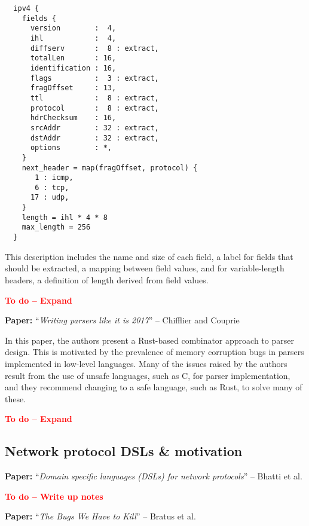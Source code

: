 \documentclass[10pt,a4paper]{article}
\newcommand{\todo}[1]{\textbf{\textcolor{red}{To do -- #1}}}
\newcommand{\paper}[3]{\vspace{4mm}\noindent\textbf{Paper:} ``\textit{#1}'' -- #2 \cite{#3}\vspace{3mm}}
\begin{document}
\begin{verbatim}
  ipv4 {
    fields {
      version        :  4,
      ihl            :  4,
      diffserv       :  8 : extract,
      totalLen       : 16,
      identification : 16,
      flags          :  3 : extract,
      fragOffset     : 13,
      ttl            :  8 : extract,
      protocol       :  8 : extract,
      hdrChecksum    : 16,
      srcAddr        : 32 : extract,
      dstAddr        : 32 : extract,
      options        : *,
    }
    next_header = map(fragOffset, protocol) {
       1 : icmp,
       6 : tcp,
      17 : udp,
    }
    length = ihl * 4 * 8
    max_length = 256
  }
\end{verbatim}

This description includes the name and size of each field, a label for fields that should
be extracted, a mapping between field values, and for variable-length headers, a
definition of length derived from field values.

\todo{Expand}

\paper{Writing parsers like it is 2017}{Chifflier and Couprie}{chifflier2017writing}

In this paper, the authors present a Rust-based combinator approach to parser design. This
is motivated by the prevalence of memory corruption bugs in parsers implemented in
low-level languages. Many of the issues raised by the authors result from the use of
unsafe languages, such as C, for parser implementation, and they recommend changing to a 
safe language, such as Rust, to solve many of these.

\todo{Expand}

\subsection{Network protocol DSLs \& motivation}

\paper{Domain specific languages (DSLs) for network protocols}{Bhatti et al.}{bhatti2009domain}

\todo{Write up notes}

\paper{The Bugs We Have to Kill}{Bratus et al.}{bratus2015bugs}
\end{document}
